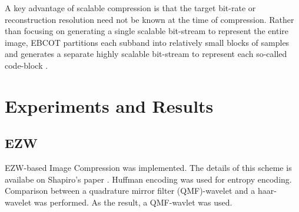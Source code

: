 \documentclass[article,oneside]{memoir}
\begin{document}
A key advantage of scalable compression is that the target bit-rate or reconstruction resolution need not be known at the time of compression. Rather than focusing on generating a single scalable bit-stream to represent the entire image, EBCOT partitions each subband into relatively small blocks of samples and generates a separate highly scalable bit-stream to represent each so-called code-block \cite{Taubman}. 

\chapter{Experiments and Results}

\section{EZW}

EZW-based Image Compression was implemented. 
The details of this scheme is availabe on Shapiro's paper \cite{Shapiro}. 
Huffman encoding was used for entropy encoding. 
Comparison between a quadrature mirror filter (QMF)-wavelet and a haar-wavelet was performed. 
As the result, a QMF-wavlet was used. 
\end{document}
